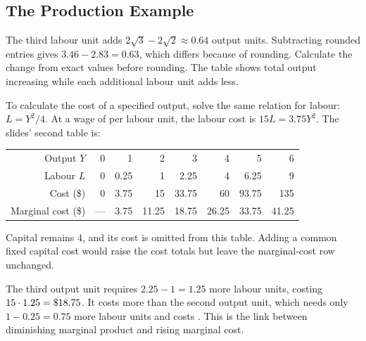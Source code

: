 \subsection{The Production Example}
The third labour unit adds $2\sqrt3-2\sqrt2\approx0.64$ output units.
Subtracting rounded entries gives $3.46-2.83=0.63$, which differs because
of rounding. Calculate the change from exact values before rounding.
The table shows total output increasing while each additional labour unit
adds less.

To calculate the cost of a specified output, solve the same relation
for labour: $L=Y^2/4$. At a wage of  per labour unit,
the labour cost is $15L=3.75Y^2$. The slides' second table is:
\begin{center}\small
\begin{tabular}{rrrrrrrr}
\toprule
Output $Y$&0&1&2&3&4&5&6\\
Labour $L$&0&0.25&1&2.25&4&6.25&9\\
Cost (\$)&0&3.75&15&33.75&60&93.75&135\\
Marginal cost (\$)&---&3.75&11.25&18.75&26.25&33.75&41.25\\
\bottomrule
\end{tabular}
\end{center}
Capital remains 4, and its cost is omitted from this table. Adding a
common fixed capital cost would raise the cost totals but leave the
marginal-cost row unchanged.

The third output unit requires $2.25-1=1.25$ more labour units, costing
$15\cdot1.25=\$18.75$. It costs more than the second output unit,
which needs only $1-0.25=0.75$ more labour units and costs .
This is the link between diminishing marginal product and rising marginal cost.

